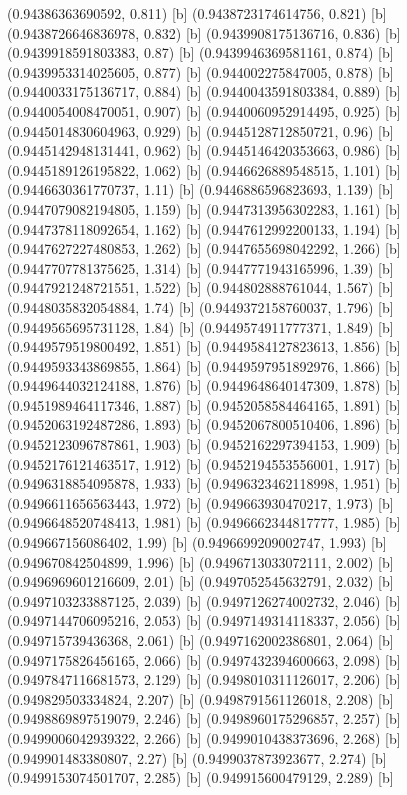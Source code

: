 {{{(0.94386363690592, 0.811) [b] 
(0.9438723174614756, 0.821) [b] 
(0.9438726646836978, 0.832) [b] 
(0.9439908175136716, 0.836) [b] 
(0.9439918591803383, 0.87) [b] 
(0.9439946369581161, 0.874) [b] 
(0.9439953314025605, 0.877) [b] 
(0.944002275847005, 0.878) [b] 
(0.9440033175136717, 0.884) [b] 
(0.9440043591803384, 0.889) [b] 
(0.9440054008470051, 0.907) [b] 
(0.9440060952914495, 0.925) [b] 
(0.9445014830604963, 0.929) [b] 
(0.9445128712850721, 0.96) [b] 
(0.9445142948131441, 0.962) [b] 
(0.9445146420353663, 0.986) [b] 
(0.9445189126195822, 1.062) [b] 
(0.9446626889548515, 1.101) [b] 
(0.9446630361770737, 1.11) [b] 
(0.9446886596823693, 1.139) [b] 
(0.9447079082194805, 1.159) [b] 
(0.9447313956302283, 1.161) [b] 
(0.9447378118092654, 1.162) [b] 
(0.9447612992200133, 1.194) [b] 
(0.9447627227480853, 1.262) [b] 
(0.9447655698042292, 1.266) [b] 
(0.9447707781375625, 1.314) [b] 
(0.9447771943165996, 1.39) [b] 
(0.9447921248721551, 1.522) [b] 
(0.944802888761044, 1.567) [b] 
(0.9448035832054884, 1.74) [b] 
(0.9449372158760037, 1.796) [b] 
(0.9449565695731128, 1.84) [b] 
(0.9449574911777371, 1.849) [b] 
(0.9449579519800492, 1.851) [b] 
(0.9449584127823613, 1.856) [b] 
(0.9449593343869855, 1.864) [b] 
(0.9449597951892976, 1.866) [b] 
(0.9449644032124188, 1.876) [b] 
(0.9449648640147309, 1.878) [b] 
(0.9451989464117346, 1.887) [b] 
(0.9452058584464165, 1.891) [b] 
(0.9452063192487286, 1.893) [b] 
(0.9452067800510406, 1.896) [b] 
(0.9452123096787861, 1.903) [b] 
(0.9452162297394153, 1.909) [b] 
(0.9452176121463517, 1.912) [b] 
(0.9452194553556001, 1.917) [b] 
(0.9496318854095878, 1.933) [b] 
(0.9496323462118998, 1.951) [b] 
(0.9496611656563443, 1.972) [b] 
(0.949663930470217, 1.973) [b] 
(0.9496648520748413, 1.981) [b] 
(0.9496662344817777, 1.985) [b] 
(0.949667156086402, 1.99) [b] 
(0.9496699209002747, 1.993) [b] 
(0.949670842504899, 1.996) [b] 
(0.9496713033072111, 2.002) [b] 
(0.9496969601216609, 2.01) [b] 
(0.9497052545632791, 2.032) [b] 
(0.9497103233887125, 2.039) [b] 
(0.9497126274002732, 2.046) [b] 
(0.9497144706095216, 2.053) [b] 
(0.9497149314118337, 2.056) [b] 
(0.949715739436368, 2.061) [b] 
(0.9497162002386801, 2.064) [b] 
(0.9497175826456165, 2.066) [b] 
(0.9497432394600663, 2.098) [b] 
(0.9497847116681573, 2.129) [b] 
(0.9498010311126017, 2.206) [b] 
(0.949829503334824, 2.207) [b] 
(0.9498791561126018, 2.208) [b] 
(0.9498869897519079, 2.246) [b] 
(0.9498960175296857, 2.257) [b] 
(0.9499006042939322, 2.266) [b] 
(0.9499010438373696, 2.268) [b] 
(0.949901483380807, 2.27) [b] 
(0.9499037873923677, 2.274) [b] 
(0.9499153074501707, 2.285) [b] 
(0.949915600479129, 2.289) [b] 
}}}
